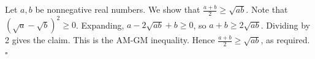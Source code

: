 Let $a, b$ be nonnegative real numbers.
We show that $\frac{a + b}{2} \geq \sqrt{ab}$.
Note that $(\sqrt{a} - \sqrt{b})^{2} \geq 0$.
Expanding, $a - 2\sqrt{ab} + b \geq 0$, so $a + b \geq 2\sqrt{ab}$.
Dividing by 2 gives the claim.
This is the AM-GM inequality.
Hence $\frac{a + b}{2} \geq \sqrt{ab}$, as required. \hfill$\square$